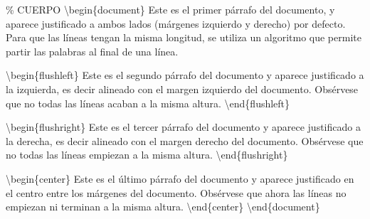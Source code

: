 \documentclass[
  a4paper,
]{scrreport}
\newenvironment{Shaded}{\begin{snugshade}}{\end{snugshade}}
\newcommand{\CommentTok}[1]{\textcolor[rgb]{0.37,0.37,0.37}{#1}}
\newcommand{\ExtensionTok}[1]{\textcolor[rgb]{0.00,0.23,0.31}{#1}}
\newcommand{\KeywordTok}[1]{\textcolor[rgb]{0.00,0.23,0.31}{#1}}
\newcommand{\NormalTok}[1]{\textcolor[rgb]{0.00,0.23,0.31}{#1}}
\begin{document}
\begin{Shaded}
\begin{Highlighting}[]
\CommentTok{\% CUERPO}
\KeywordTok{\textbackslash{}begin}\NormalTok{\{}\ExtensionTok{document}\NormalTok{\}}
\NormalTok{Este es el primer párrafo del documento, y aparece justificado a ambos lados}
\NormalTok{(márgenes izquierdo y derecho) por defecto. Para que las líneas tengan la }
\NormalTok{misma longitud, se utiliza un algoritmo que permite partir las palabras al }
\NormalTok{final de una línea.}

\KeywordTok{\textbackslash{}begin}\NormalTok{\{}\ExtensionTok{flushleft}\NormalTok{\}}
\NormalTok{Este es el segundo párrafo del documento y aparece justificado a la }
\NormalTok{izquierda, es decir alineado con el margen izquierdo del documento. }
\NormalTok{Obsérvese que no todas las líneas acaban a la misma altura.}
\KeywordTok{\textbackslash{}end}\NormalTok{\{}\ExtensionTok{flushleft}\NormalTok{\}}

\KeywordTok{\textbackslash{}begin}\NormalTok{\{}\ExtensionTok{flushright}\NormalTok{\}}
\NormalTok{Este es el tercer párrafo del documento y aparece justificado a la derecha,}
\NormalTok{es decir alineado con el margen derecho del documento. Obsérvese que no }
\NormalTok{todas las líneas empiezan a la misma altura.}
\KeywordTok{\textbackslash{}end}\NormalTok{\{}\ExtensionTok{flushright}\NormalTok{\}}

\KeywordTok{\textbackslash{}begin}\NormalTok{\{}\ExtensionTok{center}\NormalTok{\}}
\NormalTok{Este es el último párrafo del documento y aparece justificado en el centro}
\NormalTok{entre los márgenes del documento. Obsérvese que ahora las líneas no }
\NormalTok{empiezan ni terminan a la misma altura. }
\KeywordTok{\textbackslash{}end}\NormalTok{\{}\ExtensionTok{center}\NormalTok{\}}
\KeywordTok{\textbackslash{}end}\NormalTok{\{}\ExtensionTok{document}\NormalTok{\}}
\end{Highlighting}
\end{Shaded}
\end{document}

